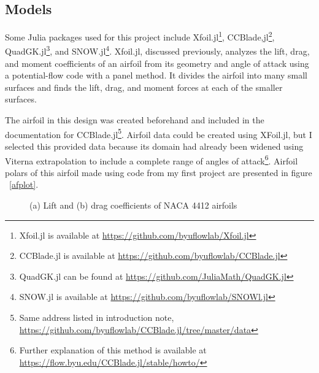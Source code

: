 \documentclass[journal ]{new-aiaa}
\begin{document}
\subsection{Models}

Some Julia packages used for this project include Xfoil.jl\footnote{Xfoil.jl is available at \url{https://github.com/byuflowlab/Xfoil.jl}}, CCBlade,jl\footnote{CCBlade.jl is available at \url{https://github.com/byuflowlab/CCBlade.jl}}, QuadGK.jl\footnote{QuadGK.jl can be found at \url{https://github.com/JuliaMath/QuadGK.jl}}, and SNOW.jl\footnote{SNOW.jl is available at \url{https://github.com/byuflowlab/SNOWl.jl}}. Xfoil.jl, discussed previously, analyzes the lift, drag, and moment coefficients of an airfoil from its geometry and angle of attack using a potential-flow code with a panel method. It divides the airfoil into many small surfaces and finds the lift, drag, and moment forces at each of the smaller surfaces. 

The airfoil in this design was created beforehand and included in the documentation for CCBlade.jl\footnote{Same address listed in introduction note, \url{https://github.com/byuflowlab/CCBlade.jl/tree/master/data}}. Airfoil data could be created using XFoil.jl, but I selected this provided data because its domain had already been widened using Viterna extrapolation to include a complete range of angles of attack\footnote{Further explanation of this method is available at \url{https://flow.byu.edu/CCBlade.jl/stable/howto/}}. Airfoil polars of this airfoil made using code from my first project are presented in figure ~\eqref{afplot}.

\begin{figure}[H]
\centering
	\caption{(a) Lift and (b) drag coefficients of NACA 4412 airfoils}
	\captionsetup{aboveskip=0pt,font=it}
	\label{afplot}
\end{figure}
\end{document}
